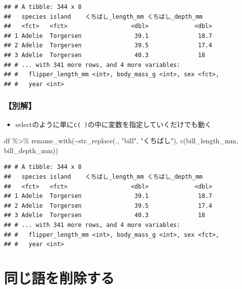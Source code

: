 \documentclass[
  xelatex,ja=standard, b5paper]{bxjsbook}
\newenvironment{Shaded}{\begin{snugshade}}{\end{snugshade}}
\newcommand{\FunctionTok}[1]{\textcolor[rgb]{0.00,0.00,0.00}{#1}}
\newcommand{\NormalTok}[1]{#1}
\newcommand{\SpecialCharTok}[1]{\textcolor[rgb]{0.00,0.00,0.00}{#1}}
\newcommand{\StringTok}[1]{\textcolor[rgb]{0.31,0.60,0.02}{#1}}
\providecommand{\tightlist}{%
  \setlength{\itemsep}{0pt}\setlength{\parskip}{0pt}}
\begin{document}
\begin{verbatim}
## # A tibble: 344 x 8
##   species island    くちばし_length_mm くちばし_depth_mm
##   <fct>   <fct>                  <dbl>             <dbl>
## 1 Adelie  Torgersen               39.1              18.7
## 2 Adelie  Torgersen               39.5              17.4
## 3 Adelie  Torgersen               40.3              18  
## # ... with 341 more rows, and 4 more variables:
## #   flipper_length_mm <int>, body_mass_g <int>, sex <fct>,
## #   year <int>
\end{verbatim}

\hypertarget{rename-strreplace1-other}{%
\subsubsection{【別解】}\label{rename-strreplace1-other}}

\begin{itemize}
\tightlist
\item
  selectのように単に\texttt{c(\ )}の中に変数を指定していくだけでも動く
\end{itemize}

\begin{Shaded}
\begin{Highlighting}[]
\NormalTok{df }\SpecialCharTok{\%\textgreater{}\%} 
  \FunctionTok{rename\_with}\NormalTok{(}\SpecialCharTok{\textasciitilde{}}\FunctionTok{str\_replace}\NormalTok{(., }\StringTok{"bill"}\NormalTok{, }\StringTok{"くちばし"}\NormalTok{),}
              \FunctionTok{c}\NormalTok{(bill\_length\_mm, bill\_depth\_mm))}
\end{Highlighting}
\end{Shaded}

\begin{verbatim}
## # A tibble: 344 x 8
##   species island    くちばし_length_mm くちばし_depth_mm
##   <fct>   <fct>                  <dbl>             <dbl>
## 1 Adelie  Torgersen               39.1              18.7
## 2 Adelie  Torgersen               39.5              17.4
## 3 Adelie  Torgersen               40.3              18  
## # ... with 341 more rows, and 4 more variables:
## #   flipper_length_mm <int>, body_mass_g <int>, sex <fct>,
## #   year <int>
\end{verbatim}

\hypertarget{rename-remove}{%
\section{同じ語を削除する}\label{rename-remove}}
\end{document}
